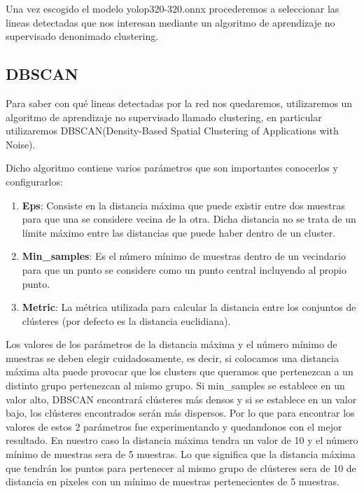 Una vez escogido el modelo yolop320-320.onnx procederemos a seleccionar las lineas detectadas que nos interesan mediante un algoritmo de aprendizaje no supervisado denonimado clustering.

\subsection{DBSCAN}
\label{sec:DBSCAN}

Para saber con qué lineas detectadas por la red nos quedaremos, utilizaremos un algoritmo de aprendizaje no supervisado llamado clustering, en particular
utilizaremos DBSCAN(Density-Based Spatial Clustering of Applications with Noise)\cite{scikitlearndbscan}.\newline

Dicho algoritmo contiene varios parámetros que son importantes conocerlos y configurarlos: 
\begin{enumerate}
  \item \textbf{Eps}: Consiste en la distancia máxima que puede existir entre dos muestras para que una se considere vecina de la otra. Dicha distancia no se trata de un límite 
  máximo entre las distancias que puede haber dentro de un cluster.
  \item \textbf{Min\_samples}: Es el número mínimo de muestras dentro de un vecindario para que un punto se considere como un punto central incluyendo al propio punto.
  \item \textbf{Metric}: La métrica utilizada para calcular la distancia entre los conjuntos de clústeres (por defecto es la distancia euclidiana). 
\end{enumerate}
Los valores de los parámetros de la distancia máxima y el número mínimo de muestras se deben elegir cuidadosamente, es decir, si colocamos una distancia 
máxima alta puede provocar que los clusters que queramos que pertenezcan a un distinto grupo pertenezcan al mismo grupo. 
Si min\_samples se establece en un valor alto, DBSCAN encontrará clústeres más densos y 
si se establece en un valor bajo, los clústeres encontrados serán más dispersos.
\break
Por lo que para encontrar los valores de estos 2 parámetros fue experimentando y quedandonos con el mejor resultado. En nuestro caso la distancia máxima tendra un valor de 10 
y el número mínimo de muestras sera de 5 muestras. Lo que significa que la distancia máxima que tendrán los puntos para pertenecer al mismo grupo de clústeres sera de 10 de distancia en pixeles
con un mínimo de muestras pertenecientes de 5 muestras. 

